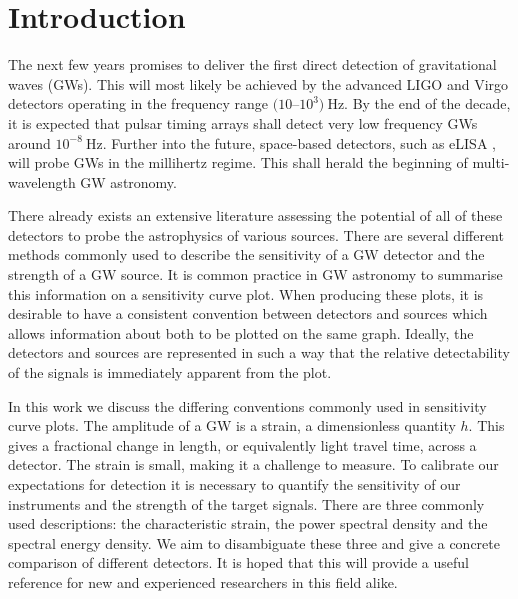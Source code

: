 \section{Introduction}


The next few years promises to deliver the first direct detection of gravitational waves (GWs). This will most likely be achieved by the advanced LIGO \citep{2010CQGra..27h4006H} and Virgo \citep{Accadia2011} detectors operating in the frequency range $(10$--$10^{3})~\mathrm{Hz}$. By the end of the decade, it is expected that pulsar timing arrays \citep{1990ApJ361300F} shall detect very low frequency GWs around $10^{-8}~\mathrm{Hz}$. Further into the future, space-based detectors, such as eLISA \citep{2012CQGra..29l4016A}, will probe GWs in the millihertz regime. This shall herald the beginning of multi-wavelength GW astronomy.

There already exists an extensive literature assessing the potential of all of these detectors to probe the astrophysics of various sources. There are several different methods commonly used to describe the sensitivity of a GW detector and the strength of a GW source. It is common practice in GW astronomy to summarise this information on a sensitivity curve plot. When producing these plots, it is desirable to have a consistent convention between detectors and sources which allows information about both to be plotted on the same graph. Ideally, the detectors and sources are represented in such a way that the relative detectability of the signals is immediately apparent from the plot.

In this work we discuss the differing conventions commonly used in sensitivity curve plots. The amplitude of a GW is a strain, a dimensionless quantity $h$. This gives a fractional change in length, or equivalently light travel time, across a detector. The strain is small, making it a challenge to measure. To calibrate our expectations for detection it is necessary to quantify the sensitivity of our instruments and the strength of the target signals. There are three commonly used descriptions: the characteristic strain, the power spectral density and the spectral energy density. We aim to disambiguate these three and give a concrete comparison of different detectors. It is hoped that this will provide a useful reference for new and experienced researchers in this field alike. 

